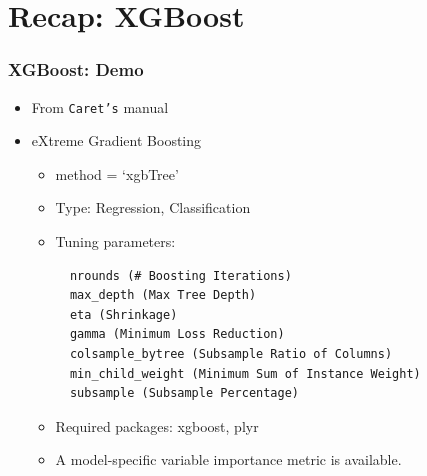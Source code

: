 \documentclass[
  shownotes,
  xcolor={svgnames},
  hyperref={colorlinks,citecolor=DarkBlue,linkcolor=DarkRed,urlcolor=DarkBlue}
  , aspectratio=169]{beamer}
\begin{document}
\section{Recap: XGBoost}

\begin{frame}[fragile]
\frametitle{XGBoost: Demo}
\begin{itemize}
\item From \texttt{Caret's} manual

\item eXtreme Gradient Boosting
\medskip
\begin{itemize}
\item method = `xgbTree'
\medskip
\item Type: Regression, Classification
\medskip
\item Tuning parameters:

  
  \begin{verbatim}
  nrounds (# Boosting Iterations)
  max_depth (Max Tree Depth)
  eta (Shrinkage)
  gamma (Minimum Loss Reduction)
  colsample_bytree (Subsample Ratio of Columns)
  min_child_weight (Minimum Sum of Instance Weight)
  subsample (Subsample Percentage)
  \end{verbatim}



  \item Required packages: xgboost, plyr
  \medskip
  \item A model-specific variable importance metric is available.
\end{itemize}
\end{itemize}

\end{frame}
\end{document}
